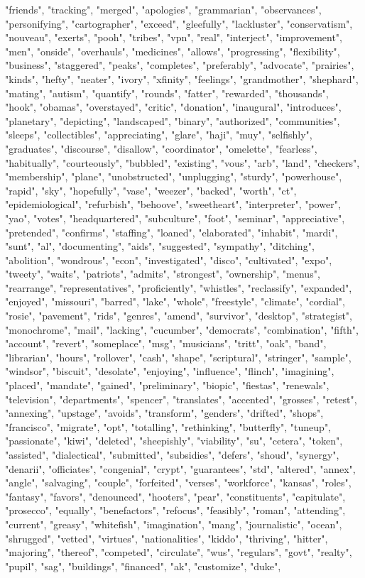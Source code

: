 "friends", "tracking", "merged", "apologies", "grammarian", "observances", "personifying", "cartographer", "exceed", "gleefully", "lackluster", "conservatism", "nouveau", "exerts", "pooh", "tribes", "vpn", "real", "interject", "improvement", "men", "onside", "overhauls", "medicines", "allows", "progressing", "flexibility", "business", "staggered", "peaks", "completes", "preferably", "advocate", "prairies", "kinds", "hefty", "neater", "ivory", "xfinity", "feelings", "grandmother", "shephard", "mating", "autism", "quantify", "rounds", "fatter", "rewarded", "thousands", "hook", "obamas", "overstayed", "critic", "donation", "inaugural", "introduces", "planetary", "depicting", "landscaped", "binary", "authorized", "communities", "sleeps", "collectibles", "appreciating", "glare", "haji", "muy", "selfishly", "graduates", "discourse", "disallow", "coordinator", "omelette", "fearless", "habitually", "courteously", "bubbled", "existing", "vous", "arb", "land", "checkers", "membership", "plane", "unobstructed", "unplugging", "sturdy", "powerhouse", "rapid", "sky", "hopefully", "vase", "weezer", "backed", "worth", "ct", "epidemiological", "refurbish", "behoove", "sweetheart", "interpreter", "power", "yao", "votes", "headquartered", "subculture", "foot", "seminar", "appreciative", "pretended", "confirms", "staffing", "loaned", "elaborated", "inhabit", "mardi", "sunt", "al", "documenting", "aids", "suggested", "sympathy", "ditching", "abolition", "wondrous", "econ", "investigated", "disco", "cultivated", "expo", "tweety", "waits", "patriots", "admits", "strongest", "ownership", "menus", "rearrange", "representatives", "proficiently", "whistles", "reclassify", "expanded", "enjoyed", "missouri", "barred", "lake", "whole", "freestyle", "climate", "cordial", "rosie", "pavement", "rids", "genres", "amend", "survivor", "desktop", "strategist", "monochrome", "mail", "lacking", "cucumber", "democrats", "combination", "fifth", "account", "revert", "someplace", "msg", "musicians", "tritt", "oak", "band", "librarian", "hours", "rollover", "cash", "shape", "scriptural", "stringer", "sample", "windsor", "biscuit", "desolate", "enjoying", "influence", "flinch", "imagining", "placed", "mandate", "gained", "preliminary", "biopic", "fiestas", "renewals", "television", "departments", "spencer", "translates", "accented", "grosses", "retest", "annexing", "upstage", "avoids", "transform", "genders", "drifted", "shops", "francisco", "migrate", "opt", "totalling", "rethinking", "butterfly", "tuneup", "passionate", "kiwi", "deleted", "sheepishly", "viability", "su", "cetera", "token", "assisted", "dialectical", "submitted", "subsidies", "defers", "shoud", "synergy", "denarii", "officiates", "congenial", "crypt", "guarantees", "std", "altered", "annex", "angle", "salvaging", "couple", "forfeited", "verses", "workforce", "kansas", "roles", "fantasy", "favors", "denounced", "hooters", "pear", "constituents", "capitulate", "prosecco", "equally", "benefactors", "refocus", "feasibly", "roman", "attending", "current", "greasy", "whitefish", "imagination", "mang", "journalistic", "ocean", "shrugged", "vetted", "virtues", "nationalities", "kiddo", "thriving", "hitter", "majoring", "thereof", "competed", "circulate", "wus", "regulars", "govt", "realty", "pupil", "sag", "buildings", "financed", "ak", "customize", "duke", 